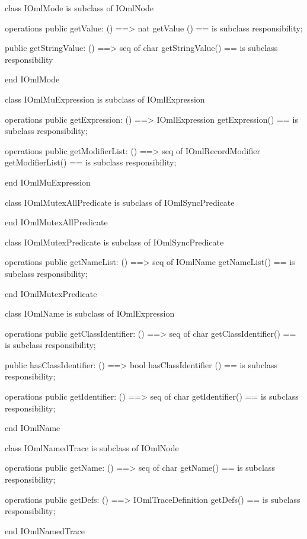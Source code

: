 \begin{vdm_al}
class IOmlMode
 is subclass of IOmlNode

operations
  public getValue: () ==> nat
  getValue () == is subclass responsibility;

  public getStringValue: () ==> seq of char
  getStringValue() == is subclass responsibility

end IOmlMode
\end{vdm_al}

\begin{vdm_al}
class IOmlMuExpression
 is subclass of IOmlExpression

operations
  public getExpression: () ==> IOmlExpression
  getExpression() == is subclass responsibility;

operations
  public getModifierList: () ==> seq of IOmlRecordModifier
  getModifierList() == is subclass responsibility;

end IOmlMuExpression
\end{vdm_al}

\begin{vdm_al}
class IOmlMutexAllPredicate
 is subclass of IOmlSyncPredicate

end IOmlMutexAllPredicate
\end{vdm_al}

\begin{vdm_al}
class IOmlMutexPredicate
 is subclass of IOmlSyncPredicate

operations
  public getNameList: () ==> seq of IOmlName
  getNameList() == is subclass responsibility;

end IOmlMutexPredicate
\end{vdm_al}

\begin{vdm_al}
class IOmlName
 is subclass of IOmlExpression

operations
  public getClassIdentifier: () ==> seq of char
  getClassIdentifier() == is subclass responsibility;

  public hasClassIdentifier: () ==> bool
  hasClassIdentifier () == is subclass responsibility;

operations
  public getIdentifier: () ==> seq of char
  getIdentifier() == is subclass responsibility;

end IOmlName
\end{vdm_al}

\begin{vdm_al}
class IOmlNamedTrace
 is subclass of IOmlNode

operations
  public getName: () ==> seq of char
  getName() == is subclass responsibility;

operations
  public getDefs: () ==> IOmlTraceDefinition
  getDefs() == is subclass responsibility;

end IOmlNamedTrace
\end{vdm_al}


